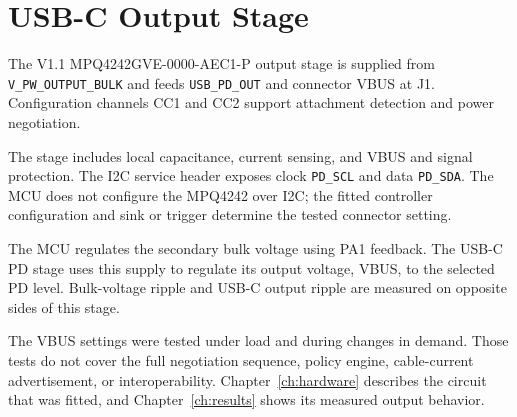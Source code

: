 \section{USB-C Output Stage}
\label{sec:req-usbc}

The V1.1 MPQ4242GVE-0000-AEC1-P output stage is supplied from \texttt{V\_PW\_OUTPUT\_BULK} and feeds \texttt{USB\_PD\_OUT} and connector VBUS at J1. Configuration channels CC1 and CC2 support attachment detection and power negotiation.

The stage includes local capacitance, current sensing, and VBUS and signal protection. The I2C service header exposes clock \texttt{PD\_SCL} and data \texttt{PD\_SDA}. The MCU does not configure the MPQ4242 over I2C; the fitted controller configuration and sink or trigger determine the tested connector setting.

The MCU regulates the secondary bulk voltage using PA1 feedback. The USB-C PD stage uses this supply to regulate its output voltage, VBUS, to the selected PD level. Bulk-voltage ripple and USB-C output ripple are measured on opposite sides of this stage.

The VBUS settings were tested under load and during changes in demand. Those tests do not cover the full negotiation sequence, policy engine, cable-current advertisement, or interoperability. Chapter~\ref{ch:hardware} describes the circuit that was fitted, and Chapter~\ref{ch:results} shows its measured output behavior.
